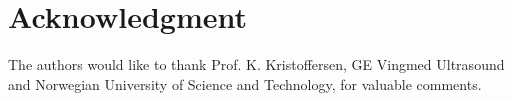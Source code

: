 \documentclass[journal]{IEEEtran}
\begin{document}



\section*{Acknowledgment}
The authors would like to thank Prof. K. Kristoffersen, GE Vingmed Ultrasound and Norwegian University of Science and Technology, for valuable comments. 


\ifCLASSOPTIONcaptionsoff
  \newpage
\fi






%
% 

\end{document}
